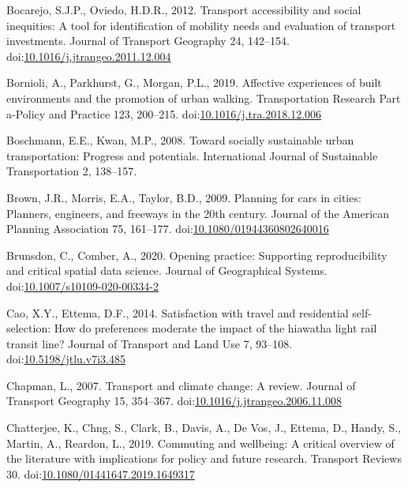 \documentclass[]{elsarticle} %
\begin{document}
\leavevmode\hypertarget{ref-Bocarejo2012transport}{}%
Bocarejo, S.J.P., Oviedo, H.D.R., 2012. Transport accessibility and
social inequities: A tool for identification of mobility needs and
evaluation of transport investments. Journal of Transport Geography 24,
142--154.
doi:\href{https://doi.org/10.1016/j.jtrangeo.2011.12.004}{10.1016/j.jtrangeo.2011.12.004}

\leavevmode\hypertarget{ref-Bornioli2019affective}{}%
Bornioli, A., Parkhurst, G., Morgan, P.L., 2019. Affective experiences
of built environments and the promotion of urban walking. Transportation
Research Part a-Policy and Practice 123, 200--215.
doi:\href{https://doi.org/10.1016/j.tra.2018.12.006}{10.1016/j.tra.2018.12.006}

\leavevmode\hypertarget{ref-Boschman2008toward}{}%
Boschmann, E.E., Kwan, M.P., 2008. Toward socially sustainable urban
transportation: Progress and potentials. International Journal of
Sustainable Transportation 2, 138--157.

\leavevmode\hypertarget{ref-Brown2009planning}{}%
Brown, J.R., Morris, E.A., Taylor, B.D., 2009. Planning for cars in
cities: Planners, engineers, and freeways in the 20th century. Journal
of the American Planning Association 75, 161--177.
doi:\href{https://doi.org/10.1080/01944360802640016}{10.1080/01944360802640016}

\leavevmode\hypertarget{ref-Brunsdon2020opening}{}%
Brunsdon, C., Comber, A., 2020. Opening practice: Supporting
reproducibility and critical spatial data science. Journal of
Geographical Systems.
doi:\href{https://doi.org/10.1007/s10109-020-00334-2}{10.1007/s10109-020-00334-2}

\leavevmode\hypertarget{ref-Cao2014satisfaction}{}%
Cao, X.Y., Ettema, D.F., 2014. Satisfaction with travel and residential
self-selection: How do preferences moderate the impact of the hiawatha
light rail transit line? Journal of Transport and Land Use 7, 93--108.
doi:\href{https://doi.org/10.5198/jtlu.v7i3.485}{10.5198/jtlu.v7i3.485}

\leavevmode\hypertarget{ref-Chapman2007transport}{}%
Chapman, L., 2007. Transport and climate change: A review. Journal of
Transport Geography 15, 354--367.
doi:\href{https://doi.org/10.1016/j.jtrangeo.2006.11.008}{10.1016/j.jtrangeo.2006.11.008}

\leavevmode\hypertarget{ref-Chatterjee2019commuting}{}%
Chatterjee, K., Chng, S., Clark, B., Davis, A., De Vos, J., Ettema, D.,
Handy, S., Martin, A., Reardon, L., 2019. Commuting and wellbeing: A
critical overview of the literature with implications for policy and
future research. Transport Reviews 30.
doi:\href{https://doi.org/10.1080/01441647.2019.1649317}{10.1080/01441647.2019.1649317}
\end{document}

